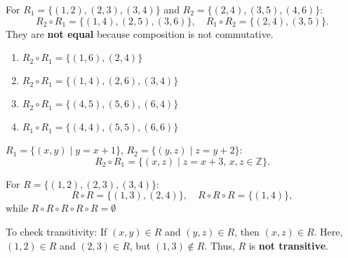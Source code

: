 \begin{answer}{3.6}
        For \(R_1 = \{(1, 2), (2, 3), (3, 4)\}\) and \(R_2 = \{(2, 4), (3, 5), (4, 6)\}\):
    \[
    R_2 \circ R_1 = \{(1, 4), (2, 5), (3, 6)\}, \quad R_1 \circ R_2 = \{(2, 4), (3, 5)\}.
    \]
    They are \textbf{not equal} because composition is not commutative.
    
\end{answer}
\begin{answer}{3.7}
    \begin{enumerate}
        \item \(R_2 \circ R_1 = \{(1, 6), (2, 4)\}\)
        \item \(R_2 \circ R_1 = \{(1, 4), (2, 6), (3, 4)\}\)
        \item \(R_2 \circ R_1 = \{(4, 5), (5, 6), (6, 4)\}\)
        \item \(R_1 \circ R_1 = \{(4, 4), (5, 5), (6, 6)\}\)
    \end{enumerate}
\end{answer}
\begin{answer}{3.8}
    \(R_1 = \{(x, y) \mid y = x + 1\}\), \(R_2 = \{(y, z) \mid z = y + 2\}\):
    \[
    R_2 \circ R_1 = \{(x, z) \mid z = x + 3, \, x, z \in \mathbb{Z}\}.
    \]
    
\end{answer}
\begin{answer}{3.9}
        For \(R = \{(1, 2), (2, 3), (3, 4)\}\):
    \[
    R \circ R = \{(1, 3), (2, 4)\}, \quad R \circ R \circ R = \{(1, 4)\},
    \]
    while \(R \circ R \circ R \circ R \circ R=\emptyset\)
    
\end{answer}
\begin{answer}{3.14}
        To check transitivity:
If \((x, y) \in R\) and \((y, z) \in R\), then \((x, z) \in R\).
Here, \((1, 2) \in R\) and \((2, 3) \in R\), but \((1, 3) \notin R\).
Thus, \(R\) is \textbf{not transitive}.

    
\end{answer}
